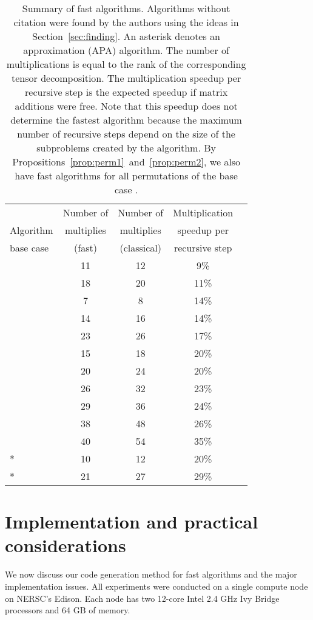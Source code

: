 \documentclass[preprint]{sigplanconf}
\begin{document}
\begin{table}[tb]
\centering
\caption{
Summary of fast algorithms.
Algorithms without citation were found by the authors using the ideas in Section~\ref{sec:finding}.
An asterisk denotes an approximation (APA) algorithm.
The number of multiplications  is equal to the rank  of the corresponding tensor decomposition.
The multiplication speedup per recursive step is the expected speedup if
matrix additions were free.
Note that this speedup does not determine the fastest algorithm because the maximum number
of recursive steps depend on the size of the subproblems created by the algorithm.
By Propositions~\ref{prop:perm1}~and~\ref{prop:perm2}, we also have fast algorithms for all permutations of the base case .
}
\begin{tabular}{l c c c c}
\toprule
                & Number of  & Number of    & Multiplication \\
Algorithm              & multiplies    &  multiplies     &  speedup per \\
base case &   (fast)         & (classical)     & recursive step \\\midrule
 & 11 & 12 & 9\% \\
 & 18 & 20 & 11\% \\
 \cite{strassen1969gaussian} & 7 & 8 & 14\% \\
 & 14 & 16 & 14\% \\
 & 23 & 26 & 17\% \\
 & 15 & 18 & 20\% \\
 & 20 & 24 & 20\% \\
 & 26 & 32 & 23\% \\
 & 29 & 36 & 24\% \\
 & 38 & 48 & 26\% \\
 \cite{smirnov2013bilinear} & 40 & 54 & 35\% \\
\midrule
* \cite{BCRL79} & 10 & 12 & 20\% \\
* \cite{Schonhage81} & 21 & 27 & 29\% \\
\bottomrule
\end{tabular}
\label{tab:algorithms}
\end{table}

\section{Implementation and practical considerations}

We now discuss our code generation method for fast algorithms and the major implementation issues.
All experiments were conducted on a single compute node on NERSC's Edison.
Each node has two 12-core Intel 2.4 GHz Ivy Bridge processors and 64 GB of memory.
\end{document}

